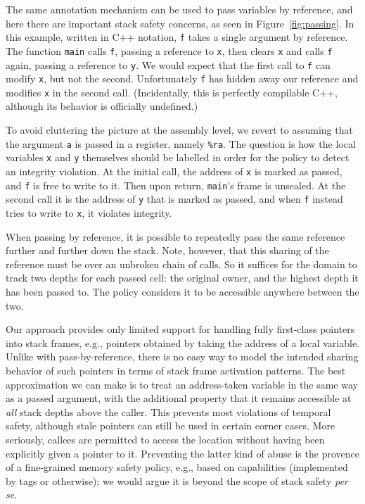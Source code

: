 \documentclass[acmsmall,review,anonymous]{acmart}\settopmatter{printfolios=true,printccs=false,printacmref=false}
\begin{document}
{The same annotation mechanism can be used to pass
variables by reference, and here there are important stack safety concerns,
as seen in Figure~\ref{fig:passing}. In this example, written in C++ notation,
{\tt f} takes a single argument by reference.  The function
{\tt main} calls {\tt f}, passing a reference to {\tt x}, then clears {\tt x} and calls
{\tt f} again, passing a reference to {\tt y}.
We would expect that the first call to {\tt f} can modify
{\tt x}, but not the second. Unfortunately {\tt f} has hidden away our reference and modifies
{\tt x} in the second call. (Incidentally, this is perfectly compilable C++,
although its behavior is officially undefined.)

To avoid cluttering the picture at the assembly level, we revert to assuming that the
argument {\tt a} is passed in a register, namely {\tt \%ra}.
The question is how the local variables {\tt x} and {\tt y} themselves
should be labelled in order for the policy to detect an integrity violation.
At the initial call, the address of {\tt x} is marked as passed, and {\tt f} is free to write to it. Then upon
return, {\tt main}'s frame is unsealed. At the second call it is the address of {\tt y} that is marked as passed,
and when {\tt f} instead tries to write to {\tt x}, it violates integrity.

When passing by reference, it is possible to repeatedly pass the same reference further
and further down the stack. Note, however, that this sharing of the reference must be over
an unbroken chain of calls. So it suffices for the domain to track two depths for each passed
cell: the original owner, and the highest depth it has been passed to. The policy considers
it to be accessible anywhere between the two.

Our approach provides only limited support for handling fully first-class pointers into
stack frames, e.g., pointers obtained by taking the address of a local variable.
Unlike with pass-by-reference, there is no easy way to model the intended
sharing behavior of such pointers in terms of stack frame activation patterns.
The best approximation we can make is to treat an address-taken variable in the
same way as a passed argument, with the additional property
that it remains accessible at \emph{all} stack depths above the caller.
This prevents most violations of temporal safety, although stale pointers
can still be used in certain corner cases.
More seriously, callees are permitted to access the location without having
been explicitly given a pointer to it.  Preventing the latter kind of abuse
is the provence of a fine-grained memory safety policy, e.g., based on
capabilities
(implemented by tags or otherwise); we would argue it is beyond the scope of
stack safety \emph{per se}.

}
\end{document}
